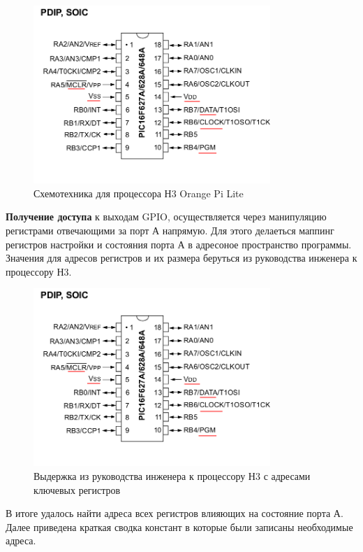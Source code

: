 \begin{figure}[h!]
    \centering
    \includegraphics[width=0.8\textwidth]{2017-05-07_at_22:31:52_screenshot.png}
    \caption{Схемотехника для процессора Н3 Orange Pi Lite}
\end{figure}

\textbf{Получение доступа} к выходам GPIO, осуществляется через манипуляцию регистрами отвечающими за порт А напрямую. Для этого делаеться маппинг регистров настройки и состояния порта А в адресоное пространство программы. Значения для адресов регистров и их размера беруться из руководства инженера к процессору Н3.


\begin{figure}[h!]
    \centering
    \includegraphics[width=0.8\textwidth]{2017-05-07_at_22:31:52_screenshot.png}
    \caption{Выдержка из руководства инженера к процессору Н3 с адресами ключевых регистров}
\end{figure}

В итоге удалось найти адреса всех регистров влияющих на состояние порта А. Далее приведена краткая сводка констант в которые были записаны необходимые адреса.

